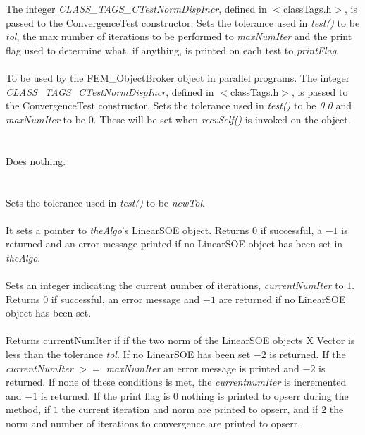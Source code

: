   \\
  \\
The integer {\em CLASS\_TAGS\_CTestNormDispIncr}, defined in
$<$classTags.h$>$, is passed to the ConvergenceTest constructor. Sets
the tolerance used in {\em test()} to be {\em tol}, the max number
of iterations to be performed to {\em maxNumIter} and the print
flag used to determine what, if anything, is printed on each test to
{\em printFlag}. \\


  \\
To be used by the FEM\_ObjectBroker object in parallel programs. The
integer {\em CLASS\_TAGS\_CTestNormDispIncr}, defined in
$<$classTags.h$>$, is passed to the ConvergenceTest constructor. Sets
the tolerance used in {\em test()} to be {\em 0.0} and {\em maxNumIter} 
to be $0$. These will be set when {\em recvSelf()} is invoked on the object. \\


 \\
 \\ 
Does nothing. \\

  \\
 \\
Sets the tolerance used in {\em test()} to be {\em newTol}. \\

 \\
It sets a pointer to {\em theAlgo}'s LinearSOE object. Returns $0$ if
successful, a $-1$ is returned and an error message printed if no
LinearSOE object has been set in {\em theAlgo}. \\

 \\
Sets an integer indicating the current number of iterations, {\em
currentNumIter} to $1$. Returns $0$ if successful, an error message
and $-1$ are returned if no LinearSOE object has been set. \\

 \\
Returns {currentNumIter} if if the two norm of the LinearSOE objects X
Vector is less than the tolerance {\em tol}. If no LinearSOE has been
set $-2$ is returned. If the {\em currentNumIter} $>=$ {\em
maxNumIter} an error message is printed and $-2$ is returned. If none
of these conditions is met, the {\em currentnumIter} is incremented
and $-1$ is returned. If the print flag is $0$ nothing is printed to
opserr during the method, if $1$ the current iteration and norm are
printed to opserr, and if $2$ the norm and number of iterations to convergence
are printed to opserr. \\ 


